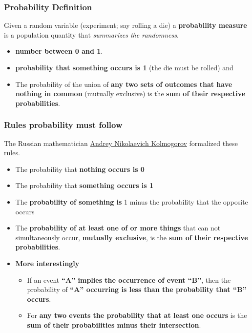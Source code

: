 \documentclass[10pt,article]{article}
\begin{document}
\subsubsection{Probability Definition}
\label{sec:orgdad6f78}
Given a random variable (experiment; say rolling a die) a \textbf{probability measure} is a population quantity that \emph{summarizes the randomness}.

\begin{itemize}
\item \textbf{number between 0 and 1}.
\item \textbf{probability that something occurs is 1} (the die must be rolled) and
\item The probability of the union of \textbf{any two sets of outcomes that have nothing in common} (mutually exclusive) is the \textbf{sum of their respective probabilities}.
\end{itemize}
\subsubsection{Rules probability must follow}
\label{sec:org984625e}
The Russian mathematician \href{https://en.wikipedia.org/wiki/Andrey\_Kolmogorov}{Andrey Nikolaevich Kolmogorov} formalized these rules.
\begin{itemize}
\item The probability that \textbf{nothing occurs is 0}
\item The probability that \textbf{something occurs is 1}
\item The \textbf{probability of something is} 1 minus the probability that the opposite occurs
\item The \textbf{probability of at least one of or more things} that can not simultaneously occur, \textbf{mutually exclusive}, is the \textbf{sum of their respective probabilities}.
\end{itemize}
\begin{itemize}
\item \textbf{More interestingly}
\label{sec:org5cb2e21}
\begin{itemize}
\item If an event \textbf{``A'' implies the occurrence of event ``B''}, then the probability of \textbf{``A'' occurring is less than the probability that ``B'' occurs}.
\item For \textbf{any two events the probability that at least one occurs} is the \textbf{sum of their probabilities minus their intersection}.
\end{itemize}
\end{itemize}
\end{document}
